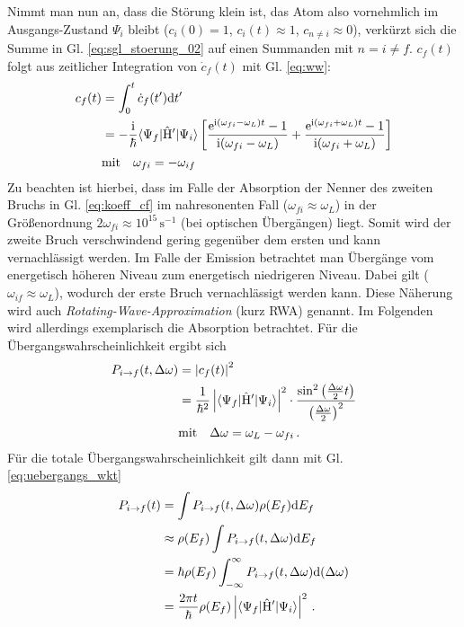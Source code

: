 Nimmt man nun an, dass die Störung klein ist, das Atom also vornehmlich im
Ausgangs-Zustand $\Psi_i$ bleibt ($c_i(0)=1$, $c_i(t)\approx 1$, $c_{n\neq
i}\approx0$), verkürzt sich die Summe in Gl. \eqref{eq:sgl_stoerung_02}
auf einen Summanden mit $n=i\neq f$. $c_f(t)$ folgt aus zeitlicher Integration von $\dot c_f(t)$ mit
Gl. \eqref{eq:ww}:
\begin{equation}\label{eq:koeff_cf}
	\begin{split}
		c_f(t) &= \int_0^t{\dot c_f(t')\mathrm{d} t'}\\
		&=
		-\frac{\mathrm{i}}{\hbar}\langle{\Psi_f}|\hat{\mathrm{H}}'|{\Psi_i}\rangle\left[\frac{\mathrm{e}^{\mathrm{i}(\omega_{fi}-\omega_L)t}-1}{\mathrm{i}(\omega_{fi}-\omega_L)}+\frac{\mathrm{e}^{\mathrm{i}(\omega_{fi}+\omega_L)t}-1}{\mathrm{i}(\omega_{fi}+\omega_L)}\right]\\
		&\text{mit}\quad
		\omega_{fi}=-\omega_{if}
	\end{split}
\end{equation}
Zu beachten ist hierbei, dass im Falle der Absorption der Nenner des zweiten
Bruchs in Gl. \eqref{eq:koeff_cf} im nahresonenten Fall
($\omega_{fi}\approx\omega_L$) in der Größenordnung $2\omega_{fi}\approx
10^{15}\,\text{s}^{-1}$ (bei optischen Übergängen) liegt. Somit wird der
zweite Bruch verschwindend gering gegenüber dem ersten und kann vernachlässigt
werden. Im Falle der Emission betrachtet man Übergänge vom energetisch höheren
Niveau zum energetisch niedrigeren Niveau. Dabei gilt
($\omega_{if}\approx\omega_L$), wodurch der erste Bruch vernachlässigt werden
kann. Diese Näherung wird auch \textit{Rotating-Wave-Approximation} (kurz RWA)
genannt. Im Folgenden wird allerdings exemplarisch die Absorption betrachtet.
Für die Übergangswahrscheinlichkeit ergibt sich
\begin{equation}\label{eq:uebergangs_wkt}
	\begin{split}
		P_{i\to f}(t,\Delta\omega) &= \left|c_f(t)\right|^2\\
		& =
		\frac{1}{\hbar^2}\left|\langle{\Psi_f}|\hat{\mathrm{H}}'|{\Psi_i}\rangle\right|^2\cdot\frac{\sin^2{\left(\frac{\Delta\omega}{2}t\right)}}{\left(\frac{\Delta\omega}{2}\right)^2}\\
		&\text{mit}\quad
		\Delta\omega=\omega_L-\omega_{fi}\,.
	\end{split}
\end{equation}
Für die totale Übergangswahrscheinlichkeit gilt dann mit Gl.
\eqref{eq:uebergangs_wkt}
\begin{equation}\label{eq:uebergangs_wkt_total}
	\begin{split}
		P_{i\to f}(t)
		&= \int{P_{i\to f}(t,\Delta\omega)\rho(E_f)}\mathrm{d} E_f\\
		&\approx \rho(E_f)\int{P_{i\to f}(t,\Delta\omega)}\mathrm{d} E_f\\
		&= \hbar\rho(E_f)\int_{-\infty}^{\infty}{P_{i\to
		f}(t,\Delta\omega)}\mathrm{d}(\Delta\omega)\\
		&= \frac{2\pi t}{\hbar}\rho(E_f)\left|\langle{\Psi_f}|\hat{\mathrm{H}}'|{\Psi_i}\rangle\right|^2\,.
	\end{split}
\end{equation}
